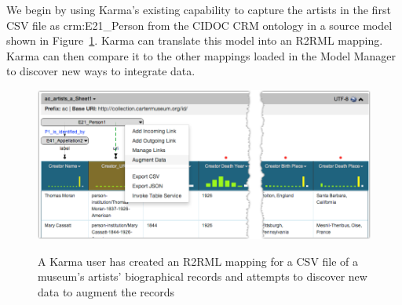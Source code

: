 We begin by using Karma's existing capability to capture the artists in the first CSV file as crm:E21\_Person from the CIDOC CRM ontology in a source model shown in Figure~\ref{fig:simple-model-screenshot}.  
Karma can translate this model into an R2RML mapping.
Karma can then compare it to the other mappings loaded in the Model Manager to discover new ways to integrate data. 

\begin{figure}
\begin{center}
\includegraphics[width=4.8in]{images/4-simple-model.png}
\vspace{-3mm}
\caption{A Karma user has created an R2RML mapping for a CSV file of a museum's artists' biographical records and attempts to discover new data to augment the records}
\vspace{-2mm}
\label{fig:simple-model-screenshot}
\end{center}
\vspace{-1.5em}
\end{figure}
